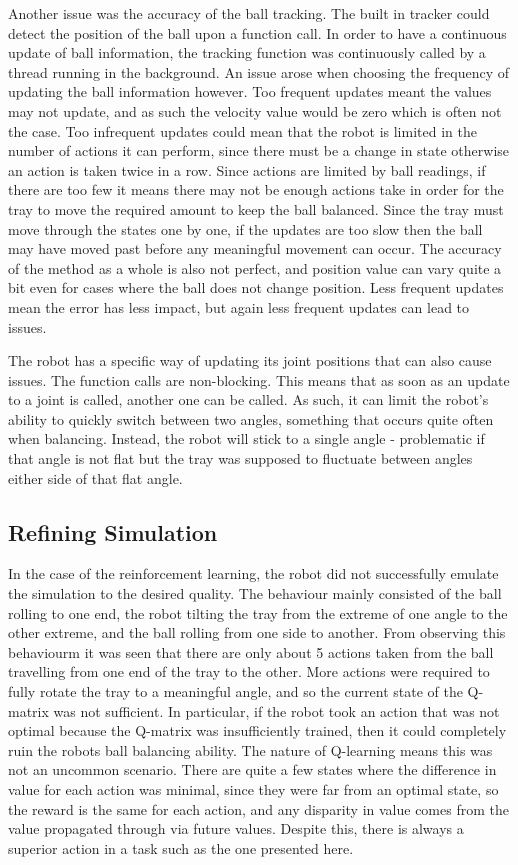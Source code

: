\documentclass[12pt,a4paper]{article}
\begin{document}
Another issue was the accuracy of the ball tracking. The built in tracker could detect the position of the ball upon a function call. In order to have a continuous update of ball information, the tracking function was continuously called by a thread running in the background. An issue arose when choosing the frequency of updating the ball information however. Too frequent updates meant the values may not update, and as such the velocity value would be zero which is often not the case. Too infrequent updates could mean that the robot is limited in the number of actions it can perform, since there must be a change in state otherwise an action is taken twice in a row. Since actions are limited by ball readings, if there are too few it means there may not be enough actions take in order for the tray to move the required amount to keep the ball balanced. Since the tray must move through the states one by one, if the updates are too slow then the ball may have moved past before any meaningful movement can occur. The accuracy of the method as a whole is also not perfect, and position value can vary quite a bit even for cases where the ball does not change position. Less frequent updates mean the error has less impact, but again less frequent updates can lead to issues.

The robot has a specific way of updating its joint positions that can also cause issues. The function calls are non-blocking. This means that as soon as an update to a joint is called, another one can be called. As such, it can limit the robot's ability to quickly switch between two angles, something that occurs quite often when balancing. Instead, the robot will stick to a single angle - problematic if that angle is not flat but the tray was supposed to fluctuate between angles either side of that flat angle. 

\subsection{Refining Simulation}
In the case of the reinforcement learning, the robot did not successfully emulate the simulation to the desired quality. The behaviour mainly consisted of the ball rolling to one end, the robot tilting the tray from the extreme of one angle to the other extreme, and the ball rolling from one side to another. From observing this behaviourm it was seen that there are only about 5 actions taken from the ball travelling from one end of the tray to the other. More actions were required to fully rotate the tray to a meaningful angle, and so the current state of the Q-matrix was not sufficient. In particular, if the robot took an action that was not optimal because the Q-matrix was insufficiently trained, then it could completely ruin the robots ball balancing ability. The nature of Q-learning means this was not an uncommon scenario. There are quite a few states where the difference in value for each action was minimal, since they were far from an optimal state, so the reward is the same for each action, and any disparity in value comes from the value propagated through via future values. Despite this, there is always a superior action in a task such as the one presented here.
\end{document}

